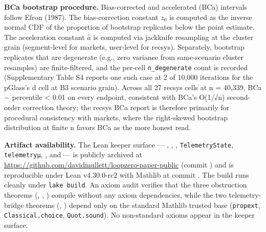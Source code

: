 \documentclass[
  11pt,
]{article}
\begin{document}
\textbf{BCa bootstrap procedure.} Bias-corrected and accelerated (BCa)
intervals follow Efron (1987). The bias-correction constant \(z_0\) is
computed as the inverse normal CDF of the proportion of bootstrap
replicates below the point estimate. The acceleration constant
\(\hat a\) is computed via jackknife resampling at the cluster grain
(segment-level for markets, user-level for recsys). Separately,
bootstrap replicates that are degenerate (e.g., zero variance from
same-scenario cluster resamples) are finite-filtered, and the per-cell
\texttt{n\_degenerate} count is recorded (Supplementary Table S4 reports
one such case at 2 of 10,000 iterations for the p\textbar Glass's d cell
at B3 scenario grain). Across all 27 recsys cells at n = 40,339,
\textbar BCa − percentile\textbar{} \textless{} 0.01 on every endpoint,
consistent with BCa's O(1/√n) second-order correction theory; the recsys
BCa report is therefore primarily for procedural consistency with
markets, where the right-skewed bootstrap distribution at finite n
favors BCa as the more honest read.

\textbf{Artifact availability.} The Lean keeper surface ---
\texttt{},
\texttt{},
\texttt{}, \texttt{TelemetryState},
\texttt{telemetryμ}, \texttt{},
and \texttt{} --- is publicly
archived at \url{https://github.com/davidmullett/loopzero-paper-public}
(commit \texttt{}) and is
reproducible under Lean v4.30.0-rc2 with Mathlib at commit
\texttt{}. The build runs
cleanly under \texttt{lake\ build}. An axiom audit verifies that the
three obstruction theorems (\texttt{},
\texttt{},
\texttt{}) compile without any axiom
dependencies, while the two telemetry-bridge theorems
(\texttt{},
\texttt{}) depend only on the
standard Mathlib trusted base (\texttt{propext},
\texttt{Classical.choice}, \texttt{Quot.sound}). No non-standard axioms
appear in the keeper surface.
\end{document}
